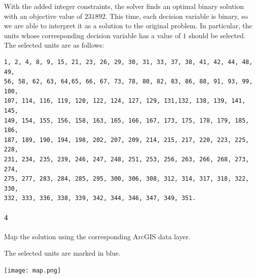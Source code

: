 \documentclass[12pt]{article}
\newenvironment{fullbox}{\begin{lrbox}{\savefullbox}\begin{minipage}{\dimexpr\textwidth-2\fboxsep\relax}}{\end{minipage}\end{lrbox}\begin{center}\framebox[\textwidth]{\usebox{\savefullbox}}\end{center}}
\newenvironment{pbox}[1][]{\begin{fullbox}\ifx#1\empty\else\paragraph{#1}\fi}{\end{fullbox}}
\theoremstyle{definition}
\begin{document}
With the added integer constraints, the solver finds an optimal binary solution with an objective value of $231892$. This time, each decision variable is binary, so we are able to interpret it as a solution to the original problem. In particular, the units whose corresponding decision variable has a value of $1$ should be selected. The selected units are as follows:
\begin{verbatim}
1, 2, 4, 8, 9, 15, 21, 23, 26, 29, 30, 31, 33, 37, 38, 41, 42, 44, 48, 49,
56, 58, 62, 63, 64,65, 66, 67, 73, 78, 80, 82, 83, 86, 88, 91, 93, 99, 100,
107, 114, 116, 119, 120, 122, 124, 127, 129, 131,132, 138, 139, 141, 145,
149, 154, 155, 156, 158, 163, 165, 166, 167, 173, 175, 178, 179, 185, 186,
187, 189, 190, 194, 198, 202, 207, 209, 214, 215, 217, 220, 223, 225, 228,
231, 234, 235, 239, 246, 247, 248, 251, 253, 256, 263, 266, 268, 273, 274,
275, 277, 283, 284, 285, 295, 300, 306, 308, 312, 314, 317, 318, 322, 330,
332, 333, 336, 338, 339, 342, 344, 346, 347, 349, 351.
\end{verbatim}


\begin{pbox}[4]
    Map the solution using the corresponding ArcGIS data layer.
\end{pbox}

The selected units are marked in blue.

\begin{center}
    \texttt{[image: map.png]}
\end{center}
\end{document}
